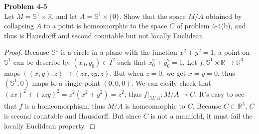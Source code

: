 \documentclass[12pt, a4paper]{article}
\theoremstyle{plain}
\newcommand{\R}{\mathbb{R}}
\newcommand{\set}[1]{\mathbb{#1}}
\newenvironment{problem}[2][Problem]
    { \begin{mdframed}[backgroundcolor=gray!20] \textbf{#1 #2} \\}
    {  \end{mdframed}}
\begin{document}
\begin{problem}{4-5}
Let $M=\set{S}^1\times \R$, and let $A=\set{S}^1\times \{0\}$. Show that the space $M/A$ obtained by collapsing $A$ to a point is homeomorphic to the space $C$ of problem 4-4(b), and thus is Hausdorff and second countable but not locally Euclidean.
\end{problem}
	\begin{proof}
	Because $\set{S}^1$ is a circle in a plane with the function $x^2+y^2=1$, a point on $\set{S}^1$ can be describe by $(x_0,y_0)\in I^2$ such that $x_0^2+y_0^2=1$. Let $f:\set{S}^1\times\R\rightarrow\R^3$ maps $((x,y),z)\mapsto (zx,zy,z)$. But when $z=0$, we get $x=y=0$, thus $(\set{S}^1,0)$ maps to a single point $(0,0,0)$. We can easily check that $(zx)^2+(zzy)^2=z^2(x^2+y^2)=z^2$, thus $f|_{M/A}:M/A\rightarrow C$. It's easy to see that $f$ is a homeomorphism, thus $M/A$ is homeomorphic to $C$. Because $C\subset \R^3$, $C$ is second countable and Hausdorff. But since $C$ is not a manifold, it must fail the locally Euclidean property.
	\end{proof}
\end{document}
